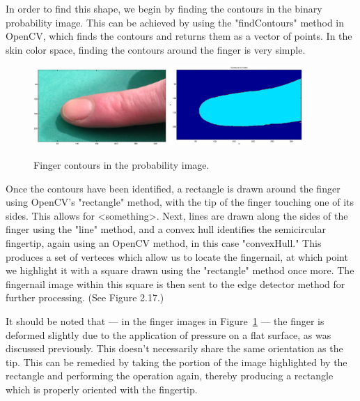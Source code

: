 In order to find this shape, we begin by finding the contours in the binary probability image. This can be achieved by using the "findContours" method in OpenCV, which finds the contours and returns them as a vector of points. In the skin color space, finding the contours around the finger is very simple.

\begin{figure}[h!]
  \centering
      \includegraphics[width=0.45\textwidth]{Chapter2/Figs/imgJIndex1.eps}
    \includegraphics[width=0.45\textwidth]{Chapter2/Figs/indexContours.eps}
    \caption{Finger contours in the probability image.}\label{fig:IndexContours}
\end{figure}

Once the contours have been identified, a rectangle is drawn around the finger using OpenCV's "rectangle" method, with the tip of the finger touching one of its sides. This allows for <something>. Next, lines are drawn along the sides of the finger using the "line" method, and a convex hull identifies the semicircular fingertip, again using an OpenCV method, in this case "convexHull." This produces a set of verteces which allow us to locate the fingernail, at which point we highlight it with a square drawn using the "rectangle" method once more. The fingernail image within this square is then sent to the edge detector method for further processing. (See Figure 2.17.)

It should be noted that --- in the finger images in Figure~\ref{fig:IndexContours} --- the finger is deformed slightly due to the application of pressure on a flat surface, as was discussed previously. This doesn't necessarily share the same orientation as the tip. This can be remedied by taking the portion of the image highlighted by the rectangle and performing the operation again, thereby producing a rectangle which is properly oriented with the fingertip.

